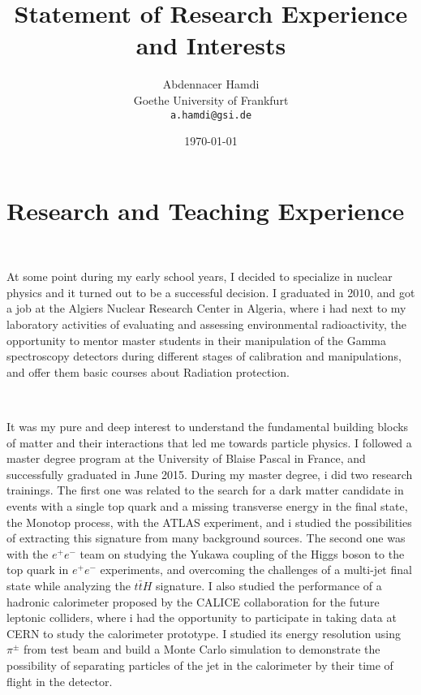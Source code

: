 \documentclass[a4paper,roman]{article}
\title{Statement of Research Experience and Interests}
\author{Abdennacer Hamdi\\
Goethe University of Frankfurt\\
\texttt{a.hamdi@gsi.de}}
\date{\today}
\begin{document}
\fontsize{12}{15}
\selectfont
\maketitle

\section*{Research and Teaching Experience}
~\par At some point during my early school years, I decided to specialize in nuclear physics and it turned out to be a successful decision. I graduated in 2010, and got a job at the Algiers Nuclear Research Center in Algeria, where i had next to my laboratory activities of evaluating and assessing environmental radioactivity, the opportunity to mentor master students in their manipulation of the Gamma spectroscopy detectors during different stages of calibration and manipulations, and offer them basic courses about Radiation protection.

~\par It was my pure and deep interest to understand the fundamental building blocks of matter and their interactions that led me towards particle physics. I followed a master degree program at the University of Blaise Pascal in France, and successfully graduated in June 2015. During my master degree, i did two research trainings. The first one was related to the search for a dark matter candidate in events with a single top quark and a missing transverse energy in the final state, the Monotop process, with the ATLAS experiment, and i studied the possibilities of extracting this signature from many background sources. The second one was with the $e^+e^-$ team on studying the Yukawa coupling of the Higgs boson to the top quark in $e^+e^-$ experiments, and overcoming the challenges of a multi-jet final state while analyzing the $t\bar{t}H$ signature. I also studied the performance of a hadronic calorimeter proposed by the CALICE collaboration for the future leptonic colliders, where i had the opportunity to participate in taking data at CERN to study the calorimeter prototype. I studied its energy resolution using $\pi^{\pm}$ from test beam and build a Monte Carlo simulation to demonstrate the possibility of separating particles of the jet in the calorimeter by their time of flight in the detector.
\end{document}
